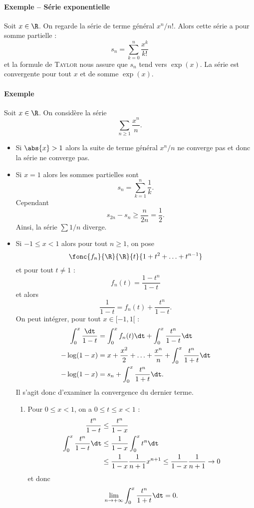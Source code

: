 \paragraph{Exemple -- Série exponentielle}Soit $x\in \R$. On regarde la série de terme général $x^{n}/n!$. Alors cette série a pour somme partielle : \[s_n = \sum_{k=0}^{n}\frac{x^{k}}{k!}\]et la formule de \textsc{Taylor} nous assure que $s_n$ tend vers $\exp(x)$. La série est convergente pour tout $x$ et de somme $\exp(x)$.

\paragraph{Exemple}Soit $x\in \R$. On considère la série \[ \sum_{n\geq 1}\frac{x^{n}}{n}.\]
\begin{itemize}
\item Si $\abs{x}>1$ alors la suite de terme général $x^{n}/n$ ne converge pas et donc la série ne converge pas.
\item Si $x=1$ alors les sommes partielles sont \[ s_n = \sum_{k=1}^{n}\frac{1}{k}.\]Cependant \[ s_{2n} - s_n \geq \frac{n}{2n} = \frac{1}{2}.\]Ainsi, la série $\sum 1/n$ diverge.
\item Si $-1\leq x<1$ alors pour tout $n\geq 1$, on pose \[ \fonc{f_n}{\R}{\R}{t}{1+t^{2}+\ldots+t^{n-1}}\]et pour tout $t\neq 1$ : \[f_{n}(t) = \frac{1-t^{n}}{1-t} \]et alors \[\frac{1}{1-t}= f_n(t) + \frac{t^{n}}{1-t}. \]On peut intégrer, pour tout $x\in[-1,1[$ : 
\begin{align*}
\int_{0}^{x}\frac{\dt}{1-t} &= \int_{0}^{x}f_n(t)\dt + \int_{0}^{x}\frac{t^{n}}{1-t}\dt\\
-\log(1-x) &= x + \frac{x^{2}}{2} +\ldots + \frac{x^{n}}{n} + \int_{0}^{x}\frac{t^{n}}{1+t}\dt\\
-\log(1-x) &= s_n+ \int_{0}^{x}\frac{t^{n}}{1+t}\dt.
\end{align*}
Il s'agit donc d'examiner la convergence du dernier terme. 
\begin{enumerate}
\item Pour $0\leq x < 1$, on a $0\leq t \leq x < 1$ : 
\begin{align*}
\frac{t^{n}}{1-t} &\leq \frac{t^{n}}{1-x} \\
\int_{0}^{x}\frac{t^{n}}{1-t}\dt &\leq \frac{1}{1-x}\int_{0}^{x}t^{n}\dt \\
&\leq \frac{1}{1-x}\frac{1}{n+1}x^{n+1}\leq \frac{1}{1-x}\frac{1}{n+1} \to 0
\end{align*}
et donc \[ \lim_{n\to+\infty} \int_{0}^{x}\frac{t^{n}}{1+t}\dt = 0. \]

\end{enumerate}
\end{itemize}
